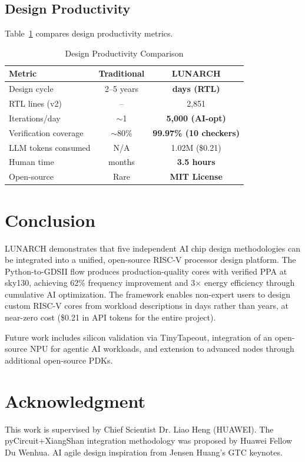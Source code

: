 \documentclass[conference]{IEEEtran}
\begin{document}
\subsection{Design Productivity}
Table~\ref{tab:prod} compares design productivity metrics.

\begin{table}[h]
\centering
\caption{Design Productivity Comparison}
\label{tab:prod}
\begin{tabular}{lcc}
\toprule
\textbf{Metric} & \textbf{Traditional} & \textbf{LUNARCH} \\
\midrule
Design cycle & 2--5 years & \textbf{days (RTL)} \\
RTL lines (v2) & -- & 2,851 \\
Iterations/day & $\sim$1 & \textbf{5,000 (AI-opt)} \\
Verification coverage & $\sim$80\% & \textbf{99.97\% (10 checkers)} \\
LLM tokens consumed & N/A & 1.02M (\$0.21) \\
Human time & months & \textbf{3.5 hours} \\
Open-source & Rare & \textbf{MIT License} \\
\bottomrule
\end{tabular}
\end{table}

\section{Conclusion}
LUNARCH demonstrates that five independent AI chip design methodologies can be integrated into a unified, open-source RISC-V processor design platform. The Python-to-GDSII flow produces production-quality cores with verified PPA at sky130, achieving 62\% frequency improvement and 3$\times$ energy efficiency through cumulative AI optimization. The framework enables non-expert users to design custom RISC-V cores from workload descriptions in days rather than years, at near-zero cost (\$0.21 in API tokens for the entire project).

Future work includes silicon validation via TinyTapeout, integration of an open-source NPU for agentic AI workloads, and extension to advanced nodes through additional open-source PDKs.

\section*{Acknowledgment}
This work is supervised by Chief Scientist Dr. Liao Heng (HUAWEI). The pyCircuit+XiangShan integration methodology was proposed by Huawei Fellow Du Wenhua. AI agile design inspiration from Jensen Huang's GTC keynotes.
\end{document}
